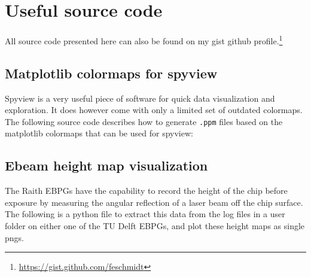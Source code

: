 \chapter{Useful source code}

\clearpage

All source code presented here can also be found on my gist github profile.\footnote{\url{https://gist.github.com/feschmidt}}

\section{Matplotlib colormaps for spyview}\label{app:spyview}
Spyview is a very useful piece of software for quick data visualization and exploration.
It does however come with only a limited set of outdated colormaps.
The following source code describes how to generate \texttt{.ppm} files based on the matplotlib colormaps that can be used for spyview:



\clearpage
\section{Ebeam height map visualization}

The Raith EBPGs have the capability to record the height of the chip before exposure by measuring the angular reflection of a laser beam off the chip surface.
%
The following is a python file to extract this data from the log files in a user folder on either one of the TU Delft EBPGs, and plot these height maps as single pngs.




